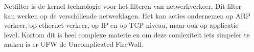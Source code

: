 Netfilter is de kernel technologie voor het filteren van netwerkverkeer. Dit filter kan werken op de verschillende netwerklagen. Het kan acties ondernemen op ARP verkeer, op ethernet verkeer, op IP en op TCP niveau, maar ook op applicatie level. Kortom dit is heel complexe materie en om deze comlexiteit iets simpeler te maken is er UFW de Uncomplicated FireWall.

